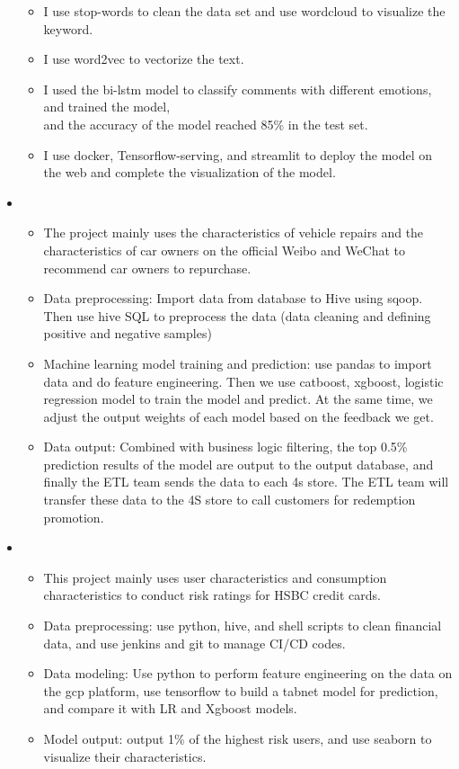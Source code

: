 \begin{itemize}[leftmargin=*]
{\begin{itemize}
       \item I use stop-words to clean the data set and use wordcloud to visualize the keyword. 	
       \item I use word2vec to vectorize the text.
       \item I used the bi-lstm model to classify comments with different emotions, and trained the model, \\and the accuracy of the model reached 85\% in the test set. 
       \item I use docker, Tensorflow-serving, and streamlit to deploy the model on the web and complete the visualization of the model.
      \end{itemize}
      }
    \item
      {\small
      \begin{itemize}
       \item The project mainly uses the characteristics of vehicle repairs and the characteristics of car owners on the official Weibo and WeChat to recommend car owners to repurchase.
       \item Data preprocessing: Import data from database to Hive using sqoop. Then use hive SQL to preprocess the data (data cleaning and defining positive and negative samples)
       \item Machine learning model training and prediction: use pandas to import data and do feature engineering. Then we use catboost, xgboost, logistic regression model to train the model and predict. At the same time, we adjust the output weights of each model based on the feedback we get.
       \item Data output: Combined with business logic filtering, the top 0.5\% prediction results of the model are output to the output database, and finally the ETL team sends the data to each 4s store. The ETL team will transfer these data to the 4S store to call customers for redemption promotion.
      \end{itemize}
      }
    \item
      {\small
      \begin{itemize}
      
       \item This project mainly uses user characteristics and consumption characteristics to conduct risk ratings for HSBC credit cards.
       \item Data preprocessing: use python, hive, and shell scripts to clean financial data, and use jenkins and git to manage CI/CD codes.
       \item Data modeling: Use python to perform feature engineering on the data on the gcp platform, use tensorflow to build a tabnet model for prediction, and compare it with LR and Xgboost models.
       \item Model output: output 1\% of the highest risk users, and use seaborn to visualize their characteristics.
      \end{itemize}
      }





\end{itemize}
